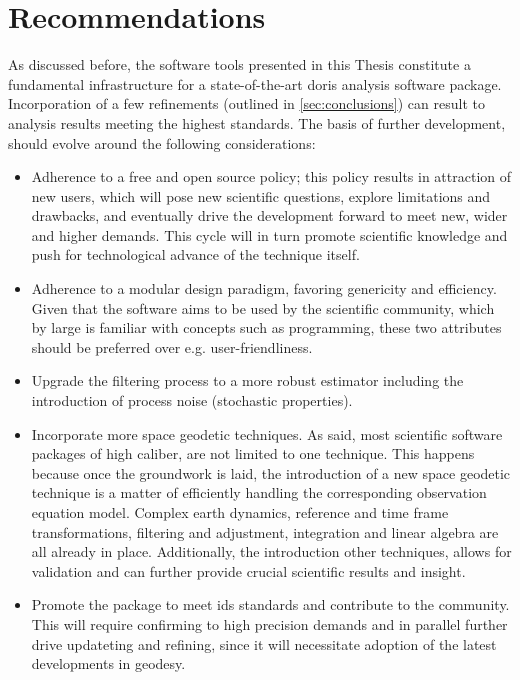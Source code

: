 \section{Recommendations}\label{sec:recommendations}

As discussed before, the software tools presented in this Thesis constitute a 
fundamental infrastructure for a state-of-the-art \gls{doris} analysis software 
package. Incorporation of a few refinements (outlined in \autoref{sec:conclusions}) 
can result to analysis results meeting the highest standards. The basis of further 
development, should evolve around the following considerations:
\begin{itemize}
  \item[] Adherence to a free and open source policy; this policy results in attraction 
    of new users, which will pose new scientific questions, explore limitations and 
    drawbacks, and eventually drive the development forward to meet new, wider and 
    higher demands. This cycle will in turn promote scientific knowledge and push 
    for technological advance of the technique itself.

  \item[] Adherence to a modular design paradigm, favoring genericity and efficiency. 
    Given that the software aims to be used by the scientific community, which by large is 
    familiar with concepts such as programming, these two attributes should be preferred 
    over e.g. user-friendliness.

  \item[] Upgrade the filtering process to a more robust estimator including the 
    introduction of process noise (stochastic properties).

  \item[] Incorporate more space geodetic techniques. As said, most scientific 
    software packages of high caliber, are not limited to one technique. This happens 
    because once the groundwork is laid, the introduction of a new space geodetic 
    technique is a matter of efficiently handling the corresponding observation 
    equation model. Complex earth dynamics, reference and time frame transformations, 
    filtering and adjustment, integration and linear algebra are all already in place. 
    Additionally, the introduction other techniques, allows for validation and 
    can further provide crucial scientific results and insight.

  \item[] Promote the package to meet \gls{ids} standards and contribute to the 
    community. This will require confirming to high precision demands and 
    in parallel further drive updateting and refining, since it will necessitate adoption of 
    the latest developments in geodesy.
\end{itemize}
